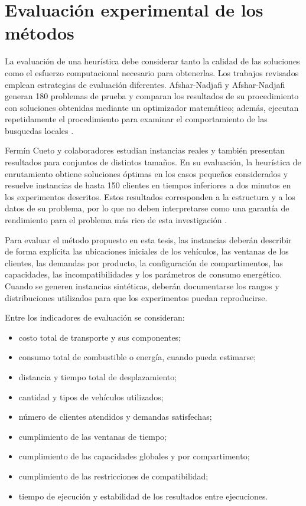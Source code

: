\section{Evaluación experimental de los métodos}
\label{sec:evaluacion}

La evaluación de una heurística debe considerar tanto la calidad de las soluciones como el esfuerzo computacional necesario para obtenerlas. Los trabajos revisados emplean estrategias de evaluación diferentes. Afshar-Nadjafi y Afshar-Nadjafi generan 180 problemas de prueba y comparan los resultados de su procedimiento con soluciones obtenidas mediante un optimizador matemático; además, ejecutan repetidamente el procedimiento para examinar el comportamiento de las busquedas locales \cite{afshar2017}.

Fermín Cueto y colaboradores estudian instancias reales y también presentan resultados para conjuntos de distintos tamaños. En su evaluación, la heurística de enrutamiento obtiene soluciones óptimas en los casos pequeños considerados y resuelve instancias de hasta 150 clientes en tiempos inferiores a dos minutos en los experimentos descritos. Estos resultados corresponden a la estructura y a los datos de su problema, por lo que no deben interpretarse como una garantía de rendimiento para el problema más rico de esta investigación \cite{fermincueto2021}.

Para evaluar el método propuesto en esta tesis, las instancias deberán describir de forma explícita las ubicaciones iniciales de los vehículos, las ventanas de los clientes, las demandas por producto, la configuración de compartimentos, las capacidades, las incompatibilidades y los parámetros de consumo energético. Cuando se generen instancias sintéticas, deberán documentarse los rangos y distribuciones utilizados para que los experimentos puedan reproducirse.

Entre los indicadores de evaluación se consideran:

\begin{itemize}
    \item costo total de transporte y sus componentes;
    \item consumo total de combustible o energía, cuando pueda estimarse;
    \item distancia y tiempo total de desplazamiento;
    \item cantidad y tipos de vehículos utilizados;
    \item número de clientes atendidos y demandas satisfechas;
    \item cumplimiento de las ventanas de tiempo;
    \item cumplimiento de las capacidades globales y por compartimento;
    \item cumplimiento de las restricciones de compatibilidad;
    \item tiempo de ejecución y estabilidad de los resultados entre ejecuciones.
\end{itemize}

